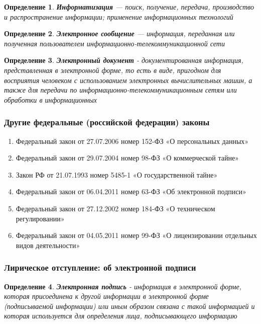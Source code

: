 \documentclass{article}
\newtheorem{definition}{Определение}
\begin{document}
\begin{definition}
    \textbf{Информатизация} — поиск, получение, передача, производство и распространение информации; применение информационных технологий
\end{definition}

\begin{definition}
    \textbf{Электронное сообщение} — информация, переданная или полученная пользователем информационно-телекоммуникационной сети 
\end{definition}

\begin{definition}
    \textbf{Электронный документ} - документированная информация, представленная в электронной форме, то есть в виде, пригодном для восприятия человеком с использованием электронных вычислительных машин, а также для передачи по информационно-телекоммуникационным сетям или обработки в информационных
\end{definition}

\subsubsection{Другие федеральные (российской федерации) законы}

\begin{enumerate}
    \item Федеральный закон от 27.07.2006 номер 152-ФЗ «О персональных данных»
    \item Федеральный закон от 29.07.2004 номер 98-ФЗ «О коммерческой тайне»
    \item Закон РФ от 21.07.1993 номер 5485-1 «О государственной тайне»
    \item Федеральный закон от 06.04.2011 номер 63-ФЗ «Об электронной подписи»
    \item Федеральный закон от 27.12.2002 номер 184-ФЗ «О техническом регулировании»
    \item Федеральный закон от 04.05.2011 номер 99-ФЗ «О лицензировании отдельных видов деятельности»
\end{enumerate}

\subsubsection{Лирическое отступление: об электронной подписи}

\begin{definition}
    \textbf{Электронная подпись} - информация в электронной форме, которая присоединена к другой информации в электронной форме (подписываемой информации) или иным образом связана с такой информацией и которая используется для определения лица, подписывающего информацию
\end{definition}
\end{document}
